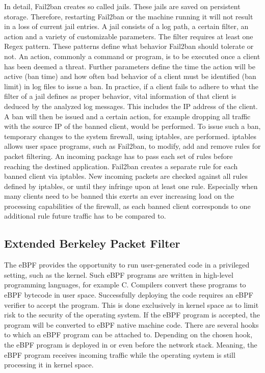 In detail, Fail2ban creates so called jails.
These jails are saved on persistent storage.
Therefore, restarting Fail2ban or the machine running it will not result in a loss of current jail entries.
A jail consists of a log path, a certain filter, an action and a variety of customizable parameters.
The filter requires at least one \ac{Regex} pattern.
These patterns define what behavior Fail2ban should tolerate or not.
An action, commonly a command or program, is to be executed once a client has been deemed a threat.
Further parameters define the time the action will be active (ban time) and how often bad behavior of a client must be identified (ban limit) in log files to issue a ban.
In practice, if a client fails to adhere to what the filter of a jail defines as proper behavior, vital information of that client is deduced by the analyzed log messages.
This includes the \ac{IP} address of the client.
A ban will then be issued and a certain action, for example dropping all traffic with the source \ac{IP} of the banned client, would be performed.
To issue such a ban, temporary changes to the system firewall, using iptables, are performed.
iptables allows user space programs, such as Fail2ban, to modify, add and remove rules for packet filtering.
An incoming package has to pass each set of rules before reaching the destined application.
Fail2ban creates a separate rule for each banned client via iptables.
New incoming packets are checked against all rules defined by iptables, or until they infringe upon at least one rule.
Especially when many clients need to be banned this exerts an ever increasing load on the processing capabilities of the firewall, as each banned client corresponds to one additional rule future traffic has to be compared to.\cite{mikolajczak:ebpf}

\subsection{Extended Berkeley Packet Filter}
The \ac{eBPF} provides the opportunity to run user-generated code in a privileged setting, such as the kernel.
Such \ac{eBPF} programs are written in high-level programming languages, for example C.
Compilers convert these programs to \ac{eBPF} bytecode in user space.
Successfully deploying the code requires an \ac{eBPF} verifier to accept the program.
This is done exclusively in kernel space as to limit risk to the security of the operating system.
If the \ac{eBPF} program is accepted, the program will be converted to \ac{eBPF} native machine code.
There are several hooks to which an \ac{eBPF} program can be attached to.
Depending on the chosen hook, the \ac{eBPF} program is deployed in or even before the network stack.
Meaning, the \ac{eBPF} program receives incoming traffic while the operating system is still processing it in kernel space.\cite{mikolajczak:ebpf}

